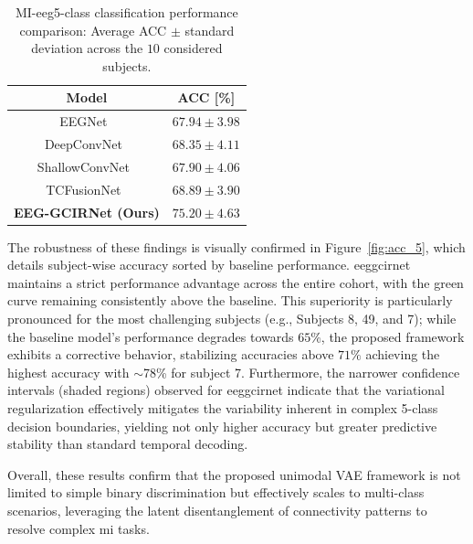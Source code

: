 \begin{table}[H]%
    
    \caption{{MI-\gls{eeg}5-class classification performance comparison: 
    Average ACC $\pm$ standard deviation across the $10$ considered subjects.}}
    {
    \begin{tabularx}{\textwidth}{CC}
        \toprule
        \textbf{Model} & \textbf{ACC [\%]} \\
        \midrule
        EEGNet~\cite{lawhern2018eegnet} & $67.94 \pm 3.98$ \\
        DeepConvNet~\cite{schirrmeister2017deep} & $68.35 \pm 4.11$ \\
        ShallowConvNet~\cite{Kim2022} & $67.90 \pm 4.06$ \\
        TCFusionNet~\cite{Musallam2021} & $68.89 \pm 3.90$ \\
        \textbf{EEG-GCIRNet (Ours)} & $\mathbf{75.20 \pm 4.63}$ \\
        \bottomrule
    \end{tabularx}}
    \label{tab:acc_5class_results}
\end{table}

The robustness of these findings is visually confirmed in Figure~\ref{fig:acc_5}, which details subject-wise accuracy sorted by baseline performance. \gls{eeggcirnet} maintains a strict performance advantage across the entire cohort, with the green curve remaining consistently above the baseline. This superiority is particularly pronounced for the most challenging subjects (e.g., Subjects 8, 49, and 7); while the baseline model's performance degrades towards $65\%$, the proposed framework exhibits a corrective behavior, stabilizing accuracies above $71\%$ achieving the highest accuracy with $\sim$78\% for subject 7. Furthermore, the narrower confidence intervals (shaded regions) observed for \gls{eeggcirnet} indicate that the variational regularization effectively mitigates the variability inherent in complex 5-class decision boundaries, yielding not only higher accuracy but greater predictive stability than standard temporal decoding.

Overall, these results confirm that the proposed unimodal VAE framework is not limited to simple binary discrimination but effectively scales to multi-class scenarios, leveraging the latent disentanglement of connectivity patterns to resolve complex \gls{mi} tasks.

